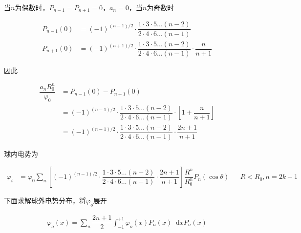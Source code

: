 \documentclass{article}
\newcommand*{\md}{\mathop{}\!\mathrm{d}}
\begin{document}
当$n$为偶数时，$P_{n-1}=P_{n+1}=0$，$a_n=0$，当$n$为奇数时

\begin{equation*}
  \begin{aligned}
    P_{n-1} \left( 0 \right) &= \left( -1  \right)^{\left( n-1 \right)/ 2} \cdot \dfrac{1 \cdot 3 \cdot 5 \dots \left( n-2 \right)}{2 \cdot 4 \cdot 6 \dots \left( n-1 \right)}  \\
    P_{n+1} \left( 0 \right) &= \left( -1  \right)^{\left( n+1 \right)/ 2} \cdot \dfrac{1 \cdot 3 \cdot 5 \dots \left( n-2 \right)}{2 \cdot 4 \cdot 6 \dots \left( n-1 \right)} \cdot \dfrac{n}{n+1}   
  \end{aligned}
\end{equation*}

因此

\begin{equation*}
  \begin{aligned}
    \dfrac{a_n R_0^n }{\varphi_0}  &=
    P_{n-1} \left( 0 \right) - P_{n+1} \left( 0 \right) \\
    &= \left( -1  \right)^{\left( n-1 \right)/ 2} \cdot \dfrac{1 \cdot 3 \cdot 5 \dots \left( n-2 \right)}{2 \cdot 4 \cdot 6 \dots \left( n-1 \right)} \cdot \left[ 1 + \dfrac{n}{n+1}  \right] \\
    &= \left( -1  \right)^{\left( n-1 \right)/ 2} \cdot \dfrac{1 \cdot 3 \cdot 5 \dots \left( n-2 \right)}{2 \cdot 4 \cdot 6 \dots \left( n-1 \right)} \cdot \dfrac{2n+1}{n+1}
  \end{aligned}
\end{equation*}

球内电势为

\begin{equation*}
  \begin{aligned}
    \varphi_i &= \varphi_0 \sum_n \left[ \left( -1  \right)^{\left( n-1 \right)/ 2} \cdot \dfrac{1 \cdot 3 \cdot 5 \dots \left( n-2 \right)}{2 \cdot 4 \cdot 6 \dots \left( n-1 \right)} \cdot \dfrac{2n+1}{n+1}
 \right] \dfrac{R^n}{R_0^n}  P_n \left( \cos \theta \right) && R<R_0, n=2k+1
  \end{aligned}
\end{equation*}

下面求解球外电势分布，将$\varphi_o$展开

\begin{equation*}
  \begin{aligned}
    \varphi_o \left( x \right) = \sum_n \dfrac{2n+1}{2} \int_{-1}^{+1} \varphi_o \left( x \right) P_n \left( x \right) \md x P_n \left( x \right) 
  \end{aligned}
\end{equation*}
\end{document}
